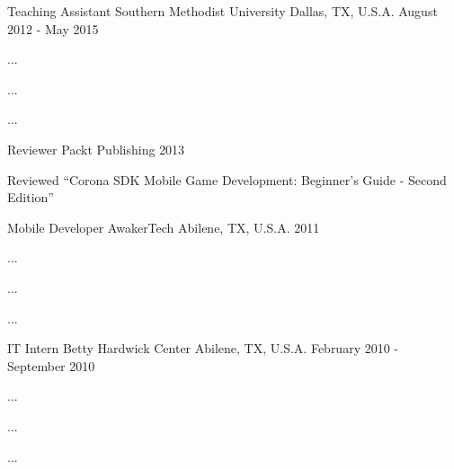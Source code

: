 

\begin{cventries}

  \cventry
  {Teaching Assistant} %
  {Southern Methodist University} %
  {Dallas, TX, U.S.A.} %
  {August 2012 - May 2015} %
  {
    \begin{cvitems} %
      \item {...}
      \item {...}
      \item {...}
    \end{cvitems}
  }

  \cventry
  {Reviewer} %
  {Packt Publishing} %
  {} %
  {2013} %
  {
    \begin{cvitems} %
      \item {Reviewed ``Corona SDK Mobile Game Development: Beginner's Guide - Second Edition''}
    \end{cvitems}
  }

  \cventry
  {Mobile Developer} %
  {AwakerTech} %
  {Abilene, TX, U.S.A.} %
  {2011} %
  {
    \begin{cvitems} %
      \item {...}
      \item {...}
      \item {...}
    \end{cvitems}
  }

  \cventry
  {IT Intern} %
  {Betty Hardwick Center} %
  {Abilene, TX, U.S.A.} %
  {February 2010 - September 2010} %
  {
    \begin{cvitems} %
      \item {...}
      \item {...}
      \item {...}
    \end{cvitems}
  }


\end{cventries}
